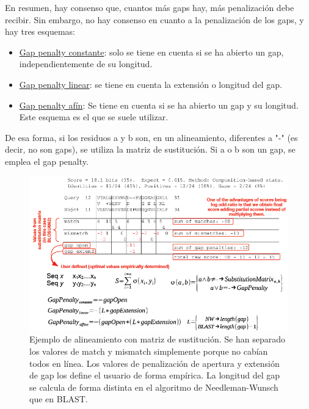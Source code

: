 \begin{table}[htbp]
\begin{mdframed}[backgroundcolor=black!10]
En resumen, hay consenso que, cuantos más gaps hay, más penalización debe recibir. Sin embargo, no hay consenso en cuanto a la penalización de los gaps, y hay tres esquemas:
\begin{itemize}
\item \underline{Gap penalty constante}: solo se tiene en cuenta si se ha abierto un gap, independientemente de su longitud.
\item \underline{Gap penalty linear}: se tiene en cuenta la extensión o longitud del gap.
\item \underline{Gap penalty afín}: Se tiene en cuenta si se ha abierto un gap y su longitud. Este esquema es el que se suele utilizar.
\end{itemize}

De esa forma, si los residuos a y b son, en un alineamiento, diferentes a "-" (es decir, no son gaps), se utiliza la matriz de sustitución. Si a o b son un gap, se emplea el gap penalty. 
\end{mdframed}
\end{table}

\begin{figure}
\centering
\includegraphics[width = \textwidth]{figs/gap-penalty.png}
\caption{Ejemplo de alineamiento con matriz de sustitución. Se han separado los valores de match y mismatch simplemente porque no cabían todos en línea. Los valores de penalización de apertura y extensión de gap los define el usuario de forma empírica. La longitud del gap se calcula de forma distinta en el algoritmo de Needleman-Wunsch que en BLAST.}
\end{figure}

